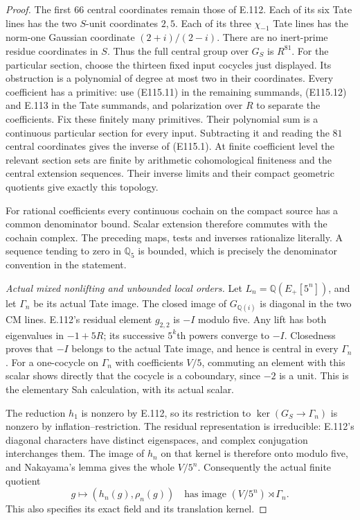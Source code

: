 \begin{proof}
The first $66$ central coordinates remain those of E.112.
Each of its six Tate lines has the two $S$-unit coordinates
$2,5$.  Each of its three $\chi_{-1}$ Tate lines has the
norm-one Gaussian coordinate $(2+i)/(2-i)$.
There are no inert-prime residue coordinates in $S$.
Thus the full central group over $G_S$ is $R^{81}$.
For the particular section, choose the thirteen fixed
input cocycles just displayed.  Its obstruction is a polynomial
of degree at most two in their coordinates.  Every coefficient
has a primitive: use (E115.11) in the remaining summands,
(E115.12) and E.113 in the Tate summands, and polarization
over $R$ to separate the coefficients.  Fix these finitely
many primitives.  Their polynomial sum is a continuous
particular section for every input.
Subtracting it and reading the $81$ central coordinates gives
the inverse of (E115.1).
At finite coefficient level the relevant section sets are
finite by arithmetic cohomological finiteness and the central
extension sequences.  Their inverse limits and their compact
geometric quotients give exactly this topology.

For rational coefficients every continuous cochain on the
compact source has a common denominator bound.
Scalar extension therefore commutes with the cochain complex.
The preceding maps, tests and inverses rationalize literally.
A sequence tending to zero in $\mathbb Q_5$ is bounded, which
is precisely the denominator convention in the statement.

\emph{Actual mixed nonlifting and unbounded local orders.}
Let $L_n=\mathbb Q(E_+[5^n])$, and let $\Gamma_n$ be its
actual Tate image.  The closed image of $G_{\mathbb Q(i)}$
is diagonal in the two CM lines.  E.112's residual element
$g_{2,2}$ is $-I$ modulo five.  Any lift has both eigenvalues
in $-1+5R$; its successive $5^k$th powers converge to $-I$.
Closedness proves that $-I$ belongs to the actual Tate image,
and hence is central in every $\Gamma_n$.
For a one-cocycle on $\Gamma_n$ with coefficients $V/5$,
commuting an element with this scalar shows directly that
the cocycle is a coboundary, since $-2$ is a unit.
This is the elementary Sah calculation, with its actual scalar.

The reduction $h_1$ is nonzero by E.112, so its restriction
to $\ker(G_S\to\Gamma_n)$ is nonzero by inflation--restriction.
The residual representation is irreducible: E.112's diagonal
characters have distinct eigenspaces, and complex conjugation
interchanges them.  The image of $h_n$ on that kernel is
therefore onto modulo five, and Nakayama's lemma gives the
whole $V/5^n$.  Consequently the actual finite quotient
\[
 g\longmapsto(h_n(g),\rho_n(g))
 \quad\text{has image }(V/5^n)\rtimes\Gamma_n.
 \tag{E115.24}
\]
This also specifies its exact field and its translation kernel.


\end{proof}
